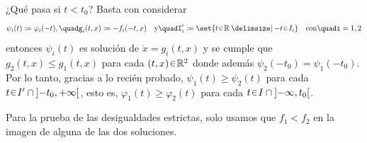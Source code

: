 \begin{sol}[Demostración]
¿Qué pasa si $t < t_0$? Basta con considerar 
\[
    \psi_i(t) \coloneq \varphi_i(-t)%
    ,\quad%
    g_i(t,x) \coloneq -f_i(-t,x)%
    \quad\text{y}\quad%
    I'_i \coloneq \set{t \en \mathbb{R} \given -t \en I_i}%
    \quad\text{con}\quad%
    i = 1,2
\]
entonces $\psi_i(t)$ es solución de $\dot{x} = g_i(t,x)$ y se cumple que $g_2(t,x) \leq g_1(t,x)$ para cada $(t, x) \en \mathbb{R}^2$ donde además $\psi_2(-t_0) = \psi_1(-t_0)$. Por lo tanto, gracias a lo recién probado, $\psi_1(t) \geq \psi_2(t)$ para cada $t \en I' \cap {]{-t_0}, +\infty[}$, esto es, $\varphi_1(t) \geq \varphi_2(t)$ para cada $t \en I \cap {]{-\infty}, t_0[}$.\par\vspace{1em}

\begin{nota}
    Para la prueba de las desigualdades estrictas, solo usamos que $f_1 < f_2$ en la imagen de alguna de las dos soluciones.
\end{nota}
\end{sol}


